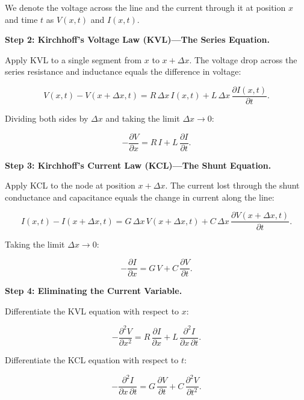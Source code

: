 We denote the voltage across the line and the current through it at position $x$ and time $t$ as $V(x,t)$ and $I(x,t)$.

\textbf{Step 2: Kirchhoff's Voltage Law (KVL)---The Series Equation.}

Apply KVL to a single segment from $x$ to $x + \Delta x$. The voltage drop across the series resistance and inductance equals the difference in voltage:

\begin{equation}
V(x,t) - V(x+\Delta x, t) = R\,\Delta x\, I(x,t) + L\,\Delta x\,\frac{\partial I(x,t)}{\partial t}.
\end{equation}

Dividing both sides by $\Delta x$ and taking the limit $\Delta x \to 0$:

\begin{equation}
\boxed{-\frac{\partial V}{\partial x} = R\,I + L\,\frac{\partial I}{\partial t}.} \tag{KVL}
\end{equation}

\textbf{Step 3: Kirchhoff's Current Law (KCL)---The Shunt Equation.}

Apply KCL to the node at position $x + \Delta x$. The current lost through the shunt conductance and capacitance equals the change in current along the line:

\begin{equation}
I(x,t) - I(x+\Delta x, t) = G\,\Delta x\, V(x+\Delta x, t) + C\,\Delta x\,\frac{\partial V(x+\Delta x, t)}{\partial t}.
\end{equation}

Taking the limit $\Delta x \to 0$:

\begin{equation}
\boxed{-\frac{\partial I}{\partial x} = G\,V + C\,\frac{\partial V}{\partial t}.} \tag{KCL}
\end{equation}

\textbf{Step 4: Eliminating the Current Variable.}

Differentiate the KVL equation with respect to $x$:

\begin{equation}
-\frac{\partial^2 V}{\partial x^2} = R\,\frac{\partial I}{\partial x} + L\,\frac{\partial^2 I}{\partial x\,\partial t}.
\end{equation}

Differentiate the KCL equation with respect to $t$:

\begin{equation}
-\frac{\partial^2 I}{\partial x\,\partial t} = G\,\frac{\partial V}{\partial t} + C\,\frac{\partial^2 V}{\partial t^2}.
\end{equation}

